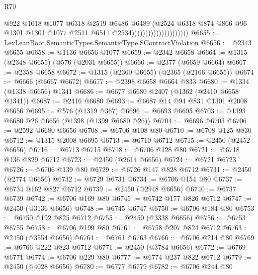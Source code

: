 \begin{lexlean}{R70}
\begin{coremodule}
                                            @922
                                            @1018
                                            @1077
                                            @6318
                                            @2519
                                            @6486
                                            @6489
                                            (@2524
                                              @6318
                                              @874
                                              @866
                                              @96
                                              @1301
                                              @1301
                                              @1077
                                              @2511
                                              @6511
                                              @2534)))))))))))))))))))))
@6655 := LexLeanBoot.SemanticTypes.SemanticType.SContractViolation
@6656 := @2343 @6655
@6658 := @1136 @6656 @1077
@6659 := @2342 @6658
@6664 := @1315 (@2348 @6655) (@576 (@2031 @6655))
@6666 := @2377 (@6659 @6664)
@6667 := @2358 @6658
@6672 := @1315 (@2360 @6655) (@2365 (@2166 @6655))
@6674 := @6666 (@6667 @6672)
@6677 := @2398 @6658 @6664 @833
@6680 := @1334 (@1338 @6656) @1341
@6686 := @6677 @6680 @2407 (@1362 (@2410 @6658 @1341))
@6687 := @2416 @6680
@6693 := @6687 @14 @94 @831 @1301 @2008 @6656
@6695 := @576 (@1319 @367)
@6696 := @6693 @6695
@6703 := @1393 @6680 @26 @6656 (@1398 (@1399 @6680 @26))
@6704 := @6696 @6703
@6706 := @2592 @6680 @6656
@6708 := @6706 @108 @80
@6710 := @6708 @125 @830
@6712 := @1315 @2008 @6695
@6713 := @6710 @6712
@6715 := @2450 (@2452 @6656)
@6716 := @6713 @6715
@6718 := @6706 @128 @80
@6721 := @6718 @136 @829 @6712
@6723 := @2450 (@2614 @6656)
@6724 := @6721 @6723
@6726 := @6706 @139 @80
@6729 := @6726 @147 @828 @6712
@6731 := @2450 (@2774 @6656)
@6732 := @6729 @6731
@6734 := @6706 @154 @80
@6737 := @6734 @162 @827 @6712
@6739 := @2450 (@2948 @6656)
@6740 := @6737 @6739
@6742 := @6706 @169 @80
@6745 := @6742 @177 @826 @6712
@6747 := @2450 (@3136 @6656)
@6748 := @6745 @6747
@6750 := @6706 @184 @80
@6753 := @6750 @192 @825 @6712
@6755 := @2450 (@3338 @6656)
@6756 := @6753 @6755
@6758 := @6706 @199 @80
@6761 := @6758 @207 @824 @6712
@6763 := @2450 (@3554 @6656)
@6764 := @6761 @6763
@6766 := @6706 @214 @80
@6769 := @6766 @222 @823 @6712
@6771 := @2450 (@3784 @6656)
@6772 := @6769 @6771
@6774 := @6706 @229 @80
@6777 := @6774 @237 @822 @6712
@6779 := @2450 (@4028 @6656)
@6780 := @6777 @6779
@6782 := @6706 @244 @80

\end{coremodule}
\end{lexlean}
